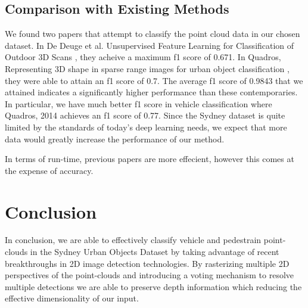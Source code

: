 \documentclass[runningheads,a4paper]{llncs}
\begin{document}
\subsection{Comparison with Existing Methods}
We found two papers that attempt to classify the point cloud data in our chosen dataset.
In De Deuge et al. Unsupervised Feature Learning for Classification of Outdoor 3D Scans
\cite{de2013unsupervised},
they acheive a maximum f1 score of 0.671. In Quadros, Representing 3D shape in sparse 
range images for urban object classification \cite{quadros2013representing}, they were 
able to attain an f1 score of 0.7. The average f1 score of 0.9843 that we attained 
indicates a significantly higher performance than these contemporaries. In particular,
we have much better f1 score in vehicle classification where Quadros, 2014 achieves an f1
score of 0.77. Since the Sydney dataset is quite limited by the standards of today's
deep learning needs, we expect that more data would greatly increase the performance of
our method.

In terms of run-time, previous papers are more effecient, however this comes at
the expense of accuracy.


\section{Conclusion}
In conclusion, we are able to effectively classify vehicle and pedestrain point-clouds in the 
Sydney Urban Objects Dataset by taking advantage of recent breakthroughs in 2D image
detection technologies. By rasterizing multiple 2D perspectives of the point-clouds and
introducing a voting mechanism to resolve multiple detections we are able to preserve
depth information which reducing the effective dimensionality of our input.



\end{document}
